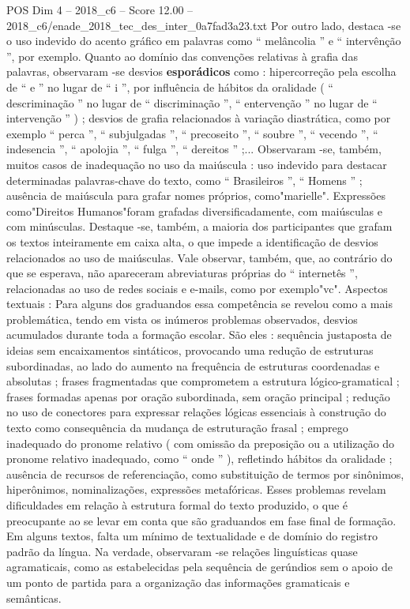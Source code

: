 \begin{textsample}{POS Dim 4 – 2018\_c6 – Score 12.00 – 2018\_c6/enade\_2018\_tec\_des\_inter\_0a7fad3a23.txt}
Por outro lado, destaca -se o uso indevido do acento gráfico em palavras como “ melâncolia ” e “ intervênção ”, por exemplo.
Quanto ao domínio das convenções relativas à grafia das palavras, observaram -se desvios \textbf{esporádicos} como : hipercorreção pela escolha de “ e ” no lugar de “ i ”, por influência de hábitos da oralidade ( “ descriminação ” no lugar de “ discriminação ”, “ entervenção ” no lugar de “ intervenção ” ) ; desvios de grafia relacionados à variação diastrática, como por exemplo “ perca ”, “ subjulgadas ”, “ precoseito ”, “ soubre ”, “ vecendo ”, “ indesencia ”, “ apolojia ”, “ fulga ”, “ dereitos ” ;...
Observaram -se, também, muitos casos de inadequação no uso da maiúscula : uso indevido para destacar determinadas palavras-chave do texto, como “ Brasileiros ”, “ Homens ” ; ausência de maiúscula para grafar nomes próprios, como"marielle".
Expressões como"Direitos Humanos"foram grafadas diversificadamente, com maiúsculas e com minúsculas.
Destaque -se, também, a maioria dos participantes que grafam os textos inteiramente em caixa alta, o que impede a identificação de desvios relacionados ao uso de maiúsculas.
Vale observar, também, que, ao contrário do que se esperava, não apareceram abreviaturas próprias do “ internetês ”, relacionadas ao uso de redes sociais e e-mails, como por exemplo"vc".
Aspectos textuais : Para alguns dos graduandos essa competência se revelou como a mais problemática, tendo em vista os inúmeros problemas observados, desvios acumulados durante toda a formação escolar.
São eles : sequência justaposta de ideias sem encaixamentos sintáticos, provocando uma redução de estruturas subordinadas, ao lado do aumento na frequência de estruturas coordenadas e absolutas ; frases fragmentadas que comprometem a estrutura lógico-gramatical ; frases formadas apenas por oração subordinada, sem oração principal ; redução no uso de conectores para expressar relações lógicas essenciais à construção do texto como consequência da mudança de estruturação frasal ; emprego inadequado do pronome relativo ( com omissão da preposição ou a utilização do pronome relativo inadequado, como “ onde ” ), refletindo hábitos da oralidade ; ausência de recursos de referenciação, como substituição de termos por sinônimos, hiperônimos, nominalizações, expressões metafóricas.
Esses problemas revelam dificuldades em relação à estrutura formal do texto produzido, o que é preocupante ao se levar em conta que são graduandos em fase final de formação.
Em alguns textos, falta um mínimo de textualidade e de domínio do registro padrão da língua.
Na verdade, observaram -se relações linguísticas quase agramaticais, como as estabelecidas pela sequência de gerúndios sem o apoio de um ponto de partida para a organização das informações gramaticais e semânticas.

\end{textsample}

